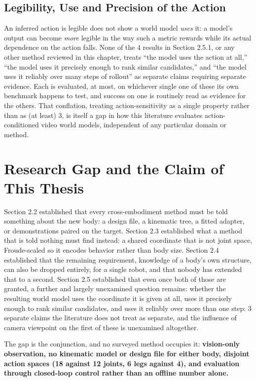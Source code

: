 \documentclass[12pt,a4paper,oneside]{report}
\begin{document}
\subsection{Legibility, Use and Precision of the Action}
An inferred action is legible does not show a world model \emph{uses} it: a model's output can become \emph{more} legible in the way such a
metric rewards while its actual dependence on the action falls. None of the 4 results in Section
2.5.1, or any other method reviewed in this chapter, treats ``the model uses the action at all,''
``the model uses it precisely enough to rank similar candidates,'' and ``the model uses it reliably
over many steps of rollout'' as separate claims requiring separate evidence. Each is evaluated, at
most, on whichever single one of these its own benchmark happens to test, and success on one is
routinely read as evidence for the others. That conflation, treating action-sensitivity as a single
property rather than as (at least) 3, is itself a gap in how this literature evaluates
action-conditioned video world models, independent of any particular domain or method.

\newpage
\section{Research Gap and the Claim of This Thesis}
Section 2.2 established that every cross-embodiment method must be told something about the new body:
a design file, a kinematic tree, a fitted adapter, or demonstrations paired on the target. Section 2.3
established what a method that is told nothing must find instead: a shared coordinate that is not
joint space, Froude-scaled so it encodes behavior rather than body size. Section 2.4 established that
the remaining requirement, knowledge of a body's own structure, can also be dropped entirely, for a
single robot, and that nobody has extended that to a second. Section 2.5 established that even once
both of those are granted, a further and largely unexamined question remains: whether the resulting
world model uses the coordinate it is given at all, uses it precisely enough to rank similar
candidates, and uses it reliably over more than one step: 3 separate claims the literature does
not treat as separate, and the influence of camera viewpoint on the first of these is
unexamined altogether.

The gap is the conjunction, and no surveyed method occupies it: \textbf{vision-only observation, no
kinematic model or design file for either body, disjoint action spaces (18 against 12
joints, 6 legs against 4), and evaluation through closed-loop control rather than an offline
number alone.}
\end{document}
